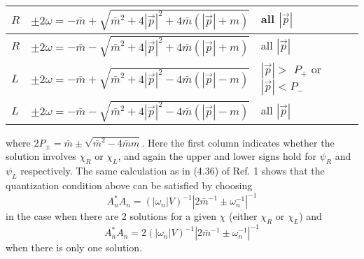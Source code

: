 \documentclass{ws-procs9x6}
\begin{document}
\noindent
\begin{tabular}{|l|l|l|}
\hline
$R$ & $\pm 2\omega =-\bar{m}+\sqrt{\bar{m}^{2}+4\left| \vec{p}\right| ^{2}
+4\bar{m}\left( \left| \vec{p}\right| +m\right) }$ & all $\left| \vec{p}
\right| $ \\ \hline
$R$ & $\pm 2\omega =-\bar{m}-\sqrt{\bar{m}^{2}+4\left| \vec{p}\right| ^{2}
+4\bar{m}\left( \left| \vec{p}\right| +m\right) }$ & all $\left| \vec{p}
\right| $ \\ \hline
$L$ & $\pm 2\omega =-\bar{m}+\sqrt{\bar{m}^{2}+4\left| \vec{p}\right| ^{2}
-4\bar{m}\left( \left| \vec{p}\right| -m\right) }$ & $\left| \vec{p}\right|
> $ $P_{+}$ or $\left| \vec{p}\right| < P_{-}$ \\ \hline
$L$ & $\pm 2\omega =-\bar{m}-\sqrt{\bar{m}^{2}+4\left| \vec{p}\right| ^{2}
-4\bar{m}\left( \left| \vec{p}\right| -m\right) }$ & all $\left| \vec{p}
\right| $ \\ \hline
\end{tabular}
\bigskip \newline
\noindent where $2P_{\pm }=\bar{m}\pm \sqrt{\bar{m}^{2}-4\bar{m}m}$. Here
the first column indicates whether the solution involves $\chi _{R}$ or
$\chi _{L}$, and again the upper and lower signs hold for $\psi _{R}$ and
$\psi _{L}$ respectively. The same calculation as in (4.36) of Ref. 1 shows
that the quantization condition above can be satisfied by choosing
\begin{equation}
A_{n}^{*}A_{n}=\left( \left| \omega _{n}\right| V\right) ^{-1}\left| 2\bar{m}
^{-1}\pm \omega _{n}^{-1}\right| ^{-1}
\end{equation}
in the case when there are 2 solutions for a given $\chi $ (either $\chi
_{R} $ or $\chi _{L}$) and
\begin{equation}
A_{n}^{*}A_{n}=2\left( \left| \omega _{n}\right| V\right) ^{-1}\left| 2\bar{m}
^{-1}\pm \omega _{n}^{-1}\right| ^{-1}
\end{equation}
when there is only one solution.
\end{document}
